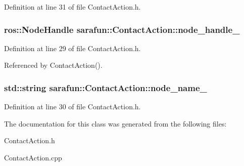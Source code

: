 Definition at line 31 of file Contact\-Action.\-h.

\hypertarget{classsarafun_1_1ContactAction_a01f3f5f489242e0ec4add31d46fb8211_a01f3f5f489242e0ec4add31d46fb8211}{
\subsubsection[{node\-\_\-handle\-\_\-}]{\setlength{\rightskip}{0pt plus 5cm}ros\-::\-Node\-Handle sarafun\-::\-Contact\-Action\-::node\-\_\-handle\-\_\-\hspace{0.3cm}{\ttfamily [private]}}}\label{classsarafun_1_1ContactAction_a01f3f5f489242e0ec4add31d46fb8211_a01f3f5f489242e0ec4add31d46fb8211}


Definition at line 29 of file Contact\-Action.\-h.



Referenced by Contact\-Action().

\hypertarget{classsarafun_1_1ContactAction_a1b1869bbc4525644b0986a0fbade1039_a1b1869bbc4525644b0986a0fbade1039}{
\subsubsection[{node\-\_\-name\-\_\-}]{\setlength{\rightskip}{0pt plus 5cm}std\-::string sarafun\-::\-Contact\-Action\-::node\-\_\-name\-\_\-\hspace{0.3cm}{\ttfamily [private]}}}\label{classsarafun_1_1ContactAction_a1b1869bbc4525644b0986a0fbade1039_a1b1869bbc4525644b0986a0fbade1039}


Definition at line 30 of file Contact\-Action.\-h.



The documentation for this class was generated from the following files\-:\begin{DoxyCompactItemize}
\item 
Contact\-Action.\-h\item 
Contact\-Action.\-cpp\end{DoxyCompactItemize}
